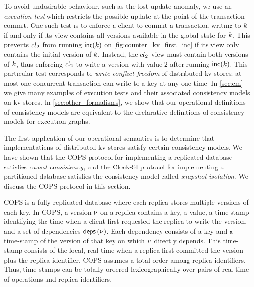 To avoid undesirable behaviour, such as the lost update anomaly, we
use an {\em execution test} which restricts the possible update at the
point of the transaction commit.  One such test is to enforce a client
to commit a transaction writing to $k$ if and only if its view
contains all versions available in the global state for $k$.  This
prevents ${cl}_2$ from running $\mathsf{inc}(k)$ on
\cref{fig:counter_kv_first_inc} if its view only contains the initial
version of $k$.  Instead, the ${cl}_2$ view must contain both
versions of $k$, thus enforcing ${cl}_2$ to write a version with
value $2$ after running $\mathsf{inc}(k)$. This particular test
corresponds to \emph{write-conflict-freedom} of distributed kv-stores:
at most one concurrent transaction can write to a key at any one time.
In \cref{sec:cm} we give many examples of execution tests and their
associated consistency models on kv-stores. In \cref{sec:other_formalisms}, we
show that our operational definitions of consistency models are
equivalent to the declarative definitions of consistency models for 
execution graphs. 








 The first application of our operational
semantics is to determine that implementations of distributed
kv-stores satisfy certain consistency models. We have shown that the
COPS protocol \citep{cops} for implementing a replicated database satisfies {\em
  causal consistency},  and the Clock-SI protocol \citep{clocksi} for implementing a
partitioned database satisfies the consistency model called {\em
  snapshot isolation}. We discuss the  COPS protocol  in this section. 




COPS is a fully replicated database where  each replica stores multiple versions of each key. 
In COPS, a version \( \nu \) on a replica contains a key, a value, a
time-stamp identifying the time when a client first requested the
replica to write the version, and a set of dependencies
$\depOf[\ver]$.  Each dependency consists of a key and a time-stamp of
the version of that key on which $\nu$ directly depends.  This
 time-stamp consists of the local, real time when a replica
first committed the version plus the replica identifier. COPS assumes
a total order among replica identifiers. Thus,  time-stamps can be
totally ordered lexicographically over pairs of real-time of
operations and replica identifiers.

